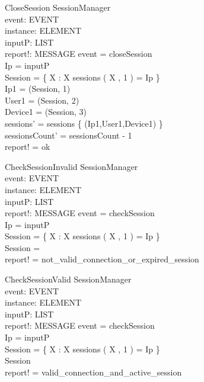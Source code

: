 \begin{schema} {CloseSession}
\Delta SessionManager \\
event: EVENT \\
instance: ELEMENT \\
inputP: LIST \\
report!: MESSAGE
\where event = closeSession \\ 
Ip = \head inputP \\
Session = \{ X : \nat \bbar X \mem sessions \land \nth( X , 1 ) = Ip \} \\
Ip1 = \nth(\head Session, 1) \\
User1 = \nth(\head Session, 2) \\
Device1 = \nth(\head Session, 3) \\
sessions' = sessions \setminus \{ (Ip1,User1,Device1) \} \\
sessionsCount' = sessionsCount - 1 \\ 
report! = ok 
\end{schema}

\begin{schema}{CheckSessionInvalid}
\Delta SessionManager \\ 
event: EVENT \\
instance: ELEMENT \\
inputP: LIST \\
report!: MESSAGE
\where event = checkSession \\ 
Ip = \head inputP \\
Session = \{ X : \nat \bbar X \mem sessions \land \nth( X , 1 ) = Ip \} \\
Session = \emptyset \\
report! = not\_valid\_connection\_or\_expired\_session 
\end{schema}

\begin{schema}{CheckSessionValid}
\Delta SessionManager \\ 
event: EVENT \\
instance: ELEMENT \\
inputP: LIST \\
report!: MESSAGE
\where event = checkSession \\ 
Ip = \head inputP \\
Session = \{ X : \nat \bbar X \mem sessions \land \nth( X , 1 ) = Ip \} \\
Session \neq \emptyset \\
report! = valid\_connection\_and\_active\_session 
\end{schema}

